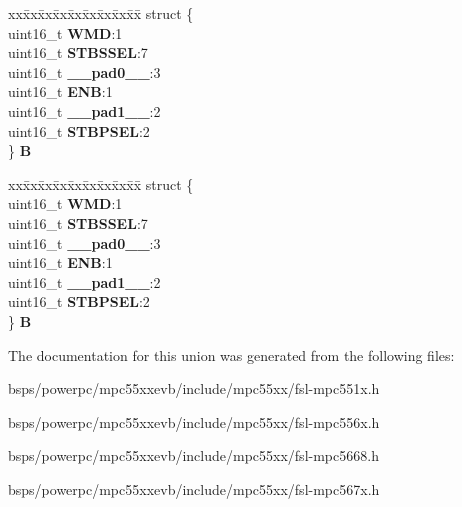 \begin{DoxyCompactItemize}
\begin{tabbing}
\end{tabbing}\item 
\mbox{\label{unionuSTBSCR_a69b8e421ec08e2f9a2e4a7c31a439766}} 
\begin{tabbing}
xx\=xx\=xx\=xx\=xx\=xx\=xx\=xx\=xx\=\kill
struct \{\\
\>uint16\_t {\bfseries WMD}:1\\
\>uint16\_t {\bfseries STBSSEL}:7\\
\>uint16\_t {\bfseries \_\_pad0\_\_}:3\\
\>uint16\_t {\bfseries ENB}:1\\
\>uint16\_t {\bfseries \_\_pad1\_\_}:2\\
\>uint16\_t {\bfseries STBPSEL}:2\\
\} {\bfseries B}\\

\end{tabbing}\item 
\mbox{\label{unionuSTBSCR_a93010170259e586ad830095c3b66e792}} 
\begin{tabbing}
xx\=xx\=xx\=xx\=xx\=xx\=xx\=xx\=xx\=\kill
struct \{\\
\>uint16\_t {\bfseries WMD}:1\\
\>uint16\_t {\bfseries STBSSEL}:7\\
\>uint16\_t {\bfseries \_\_pad0\_\_}:3\\
\>uint16\_t {\bfseries ENB}:1\\
\>uint16\_t {\bfseries \_\_pad1\_\_}:2\\
\>uint16\_t {\bfseries STBPSEL}:2\\
\} {\bfseries B}\\

\end{tabbing}\end{DoxyCompactItemize}


The documentation for this union was generated from the following files\+:\begin{DoxyCompactItemize}
\item 
bsps/powerpc/mpc55xxevb/include/mpc55xx/fsl-\/mpc551x.\+h\item 
bsps/powerpc/mpc55xxevb/include/mpc55xx/fsl-\/mpc556x.\+h\item 
bsps/powerpc/mpc55xxevb/include/mpc55xx/fsl-\/mpc5668.\+h\item 
bsps/powerpc/mpc55xxevb/include/mpc55xx/fsl-\/mpc567x.\+h\end{DoxyCompactItemize}
